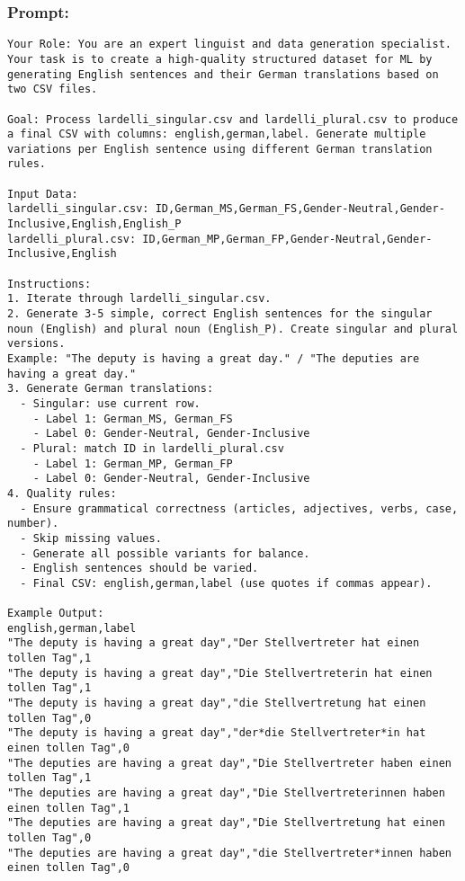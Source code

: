 \begin{appendices}
\subsubsection{Prompt: } 

\begin{lstlisting}
Your Role: You are an expert linguist and data generation specialist. Your task is to create a high-quality structured dataset for ML by generating English sentences and their German translations based on two CSV files.

Goal: Process lardelli_singular.csv and lardelli_plural.csv to produce a final CSV with columns: english,german,label. Generate multiple variations per English sentence using different German translation rules.

Input Data:
lardelli_singular.csv: ID,German_MS,German_FS,Gender-Neutral,Gender-Inclusive,English,English_P
lardelli_plural.csv: ID,German_MP,German_FP,Gender-Neutral,Gender-Inclusive,English

Instructions:
1. Iterate through lardelli_singular.csv.
2. Generate 3-5 simple, correct English sentences for the singular noun (English) and plural noun (English_P). Create singular and plural versions.
Example: "The deputy is having a great day." / "The deputies are having a great day."
3. Generate German translations:
  - Singular: use current row.
    - Label 1: German_MS, German_FS
    - Label 0: Gender-Neutral, Gender-Inclusive
  - Plural: match ID in lardelli_plural.csv
    - Label 1: German_MP, German_FP
    - Label 0: Gender-Neutral, Gender-Inclusive
4. Quality rules:
  - Ensure grammatical correctness (articles, adjectives, verbs, case, number).
  - Skip missing values.
  - Generate all possible variants for balance.
  - English sentences should be varied.
  - Final CSV: english,german,label (use quotes if commas appear).

Example Output:
english,german,label
"The deputy is having a great day","Der Stellvertreter hat einen tollen Tag",1
"The deputy is having a great day","Die Stellvertreterin hat einen tollen Tag",1
"The deputy is having a great day","die Stellvertretung hat einen tollen Tag",0
"The deputy is having a great day","der*die Stellvertreter*in hat einen tollen Tag",0
"The deputies are having a great day","Die Stellvertreter haben einen tollen Tag",1
"The deputies are having a great day","Die Stellvertreterinnen haben einen tollen Tag",1
"The deputies are having a great day","Die Stellvertretung hat einen tollen Tag",0
"The deputies are having a great day","die Stellvertreter*innen haben einen tollen Tag",0


\end{lstlisting}
\end{appendices}
